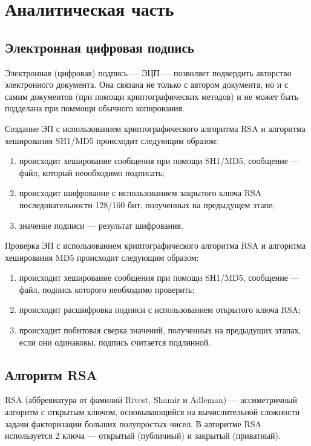 \chapter{Аналитическая часть}
\section{Электронная цифровая подпись}

Электронная (цифровая) подпись --- ЭЦП --- позволяет подвердить авторство электронного документа. Она связана не только с автором документа, но и с самим документов (при помощи криптографических методов) и не может быть подделана при поммощи обычного копирования.

Создание ЭП с использованием криптографического алгоритма RSA и алгоритма хеширования SH1/MD5 происходит следующим образом:
\begin{enumerate}[label=\arabic*)]
	\item происходит хеширование сообщения при помощи SH1/MD5, сообщение --- файл, который неообходимо подписать;
	\item происходит шифрование с использованием закрытого ключа RSA последовательности 128/160 бит, полученных на предыдущем этапе;
	\item значение подписи --- результат шифрования.
\end{enumerate}

Проверка ЭП с использованием криптографического алгоритма RSA и алгоритма хеширования MD5 происходит следующим образом:
\begin{enumerate}[label=\arabic*)]
	\item происходит хеширование сообщения при помощи SH1/MD5, сообщение --- файл, подпись которого необходимо проверить;
	\item происходит расшифровка
	 подписи с использованием открытого ключа RSA;
	\item происходит побитовая сверка значений, полученных на предыдущих этапах, если они одинаковы, подпись считается подлинной.
\end{enumerate}

\section{Алгоритм RSA}

RSA (аббревиатура от фамилий Rivest, Shamir и Adleman) --- ассиметричный алгоритм с открытым ключом, основывающийся на вычислительной сложности задачи факторизации больших полупростых чисел. В алгоритме RSA используется 2 ключа --- открытый (публичный) и закрытый (приватный).

